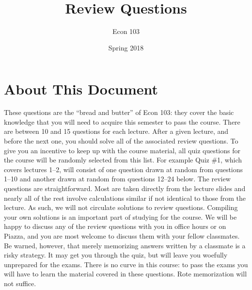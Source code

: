 \documentclass[addpoints,12pt]{exam}
\title{Review Questions}
\author{Econ 103}
\date{Spring 2018}
\begin{document}
\maketitle

\section*{About This Document}
These questions are the ``bread and butter'' of Econ 103: they cover the basic knowledge that you will need to acquire this semester to pass the course. 
There are between 10 and 15 questions for each lecture.
After a given lecture, and before the next one, you should solve all of the associated review questions.
To give you an incentive to keep up with the course material, all quiz questions for the course will be randomly selected from this list.
For example Quiz \#1, which covers lectures 1--2, will consist of one question drawn at random from questions 1--10 and another drawn at random from questions 12--24 below.
The review questions are straightforward. 
Most are taken directly from the lecture slides and nearly all of the rest involve calculations similar if not identical to those from the lecture.
As such, we will not circulate solutions to review questions.
Compiling your own solutions is an important part of studying for the course.
We will be happy to discuss any of the review questions with you in office hours or on Piazza, and you are most welcome to discuss them with your fellow classmates.
Be warned, however, that merely memorizing answers written by a classmate is a risky strategy.
It may get you through the quiz, but will leave you woefully unprepared for the exams.
There is no curve in this course: to pass the exams you will have to learn the material covered in these questions.
Rote memorization will not suffice.

\end{document}
